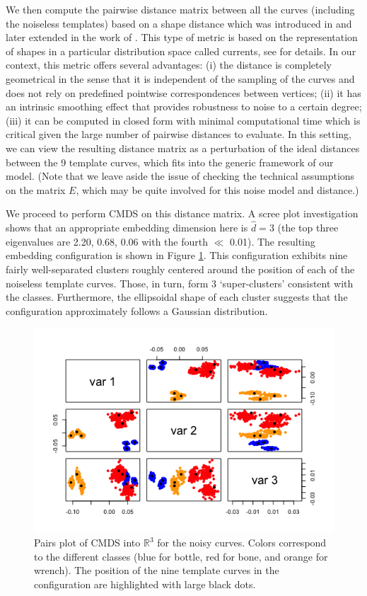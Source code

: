 We then compute the pairwise distance matrix between all the curves (including the noiseless templates) based on a shape distance which was introduced in \cite{Glaunes2008} and later extended in the work of \cite{Kaltenmark2017}. This type of metric is based on the representation of shapes in a particular distribution space called currents, see \cite{Kaltenmark2017} for details. In our context, this metric offers several advantages: (i) the distance is completely geometrical in the sense that it is independent of the sampling of the curves and does not rely on predefined pointwise correspondences between vertices; (ii) it has an intrinsic smoothing effect that provides robustness to noise to a certain degree; (iii) it can be computed in closed form with minimal computational time which is critical given the large number of pairwise distances to evaluate. In this setting, we can view the resulting distance matrix as a perturbation of the ideal distances between the 9 template curves, which fits into the generic framework of our model. (Note that we leave aside the issue of checking the technical assumptions on the matrix $E$, which may be quite involved for this noise model and distance.)

We proceed to perform CMDS on this distance matrix. A scree plot investigation
shows that an appropriate embedding dimension here is $\hat{d} = 3$ (the top three eigenvalues are 2.20, 0.68, 0.06 with the fourth $\ll$ 0.01).
The resulting embedding configuration is shown in Figure \ref{fig:large currents}. 
This configuration exhibits nine fairly well-separated clusters roughly centered around the position of each of the noiseless template curves. Those, in turn, form 3 `super-clusters' consistent with the classes. Furthermore, the ellipsoidal shape of each cluster suggests that the configuration approximately follows a Gaussian distribution.

\begin{figure}[htp]
\centering
\includegraphics[scale=0.9]{./figure/Pairs_plot_noisy_total_linear_909.png}
\caption{Pairs plot of CMDS into $\mathbb{R}^3$ for the noisy curves. Colors correspond to the different classes (blue for bottle, red for bone, and orange for wrench). The position of the nine template curves in the configuration are highlighted with large black dots.}
    \label{fig:large currents}
\end{figure}

